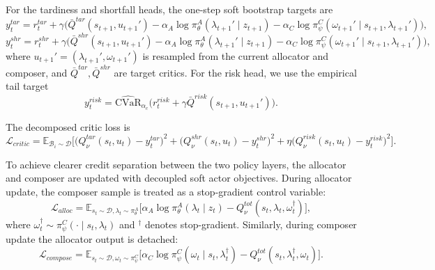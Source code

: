 \documentclass[a4paper,fleqn]{cas-sc}
\begin{document}
For the tardiness and shortfall heads, the one-step soft bootstrap targets are
\begin{equation}
y_t^{tar}=r_t^{tar}
+ \gamma
\Big(
\bar Q^{tar}(s_{t+1},u_{t+1}')
- \alpha_A \log \pi_{\theta}^{A}(\lambda_{t+1}'\mid z_{t+1})
- \alpha_C \log \pi_{\psi}^{C}(\omega_{t+1}'\mid s_{t+1},\lambda_{t+1}')
\Big),
\label{eq:target_tar}
\end{equation}
\begin{equation}
y_t^{shr}=r_t^{shr}
+ \gamma
\Big(
\bar Q^{shr}(s_{t+1},u_{t+1}')
- \alpha_A \log \pi_{\theta}^{A}(\lambda_{t+1}'\mid z_{t+1})
- \alpha_C \log \pi_{\psi}^{C}(\omega_{t+1}'\mid s_{t+1},\lambda_{t+1}')
\Big),
\label{eq:target_shr}
\end{equation}
where $u_{t+1}'=(\lambda_{t+1}',\omega_{t+1}')$ is resampled from the current allocator and composer, and $\bar Q^{tar},\bar Q^{shr}$ are target critics. For the risk head, we use the empirical tail target
\begin{equation}
y_t^{risk}=
\widehat{\mathrm{CVaR}}_{\alpha_c}
\Big(
r_t^{risk}+\gamma \bar Q^{risk}(s_{t+1},u_{t+1}')
\Big).
\label{eq:target_risk}
\end{equation}

The decomposed critic loss is
\begin{equation}
\mathcal{L}_{critic}=
\mathbb{E}_{\mathcal{B}_i\sim \mathcal{D}}
\Big[
\big(Q^{tar}_{\nu}(s_t,u_t)-y_t^{tar}\big)^2
+
\big(Q^{shr}_{\nu}(s_t,u_t)-y_t^{shr}\big)^2
+
\eta\big(Q^{risk}_{\nu}(s_t,u_t)-y_t^{risk}\big)^2
\Big].
\label{eq:critic_loss}
\end{equation}

To achieve clearer credit separation between the two policy layers, the allocator and composer are updated with decoupled soft actor objectives. During allocator update, the composer sample is treated as a stop-gradient control variable:
\begin{equation}
\mathcal{L}_{alloc}=
\mathbb{E}_{s_t\sim\mathcal{D},\lambda_t\sim\pi_{\theta}^{A}}
\Big[
\alpha_A \log \pi_{\theta}^{A}(\lambda_t\mid z_t)
- Q_{\nu}^{tot}(s_t,\lambda_t,\omega_t^{\dagger})
\Big],
\label{eq:alloc_loss}
\end{equation}
where $\omega_t^{\dagger}\sim\pi_{\psi}^{C}(\cdot\mid s_t,\lambda_t)$ and ${}^{\dagger}$ denotes stop-gradient. Similarly, during composer update the allocator output is detached:
\begin{equation}
\mathcal{L}_{compose}=
\mathbb{E}_{s_t\sim\mathcal{D},\omega_t\sim\pi_{\psi}^{C}}
\Big[
\alpha_C \log \pi_{\psi}^{C}(\omega_t\mid s_t,\lambda_t^{\dagger})
- Q_{\nu}^{tot}(s_t,\lambda_t^{\dagger},\omega_t)
\Big].
\label{eq:compose_loss}
\end{equation}
\end{document}
